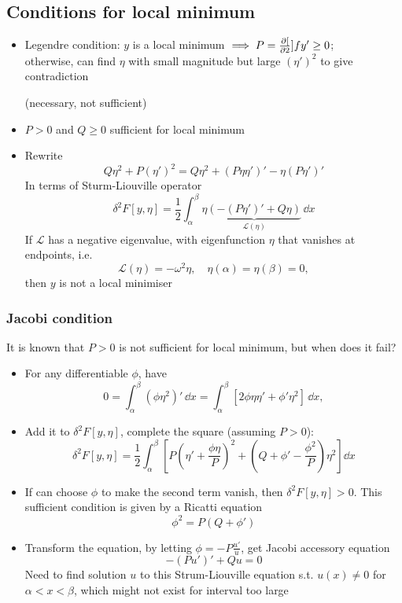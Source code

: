\subsection*{Conditions for local minimum}
\begin{itemize}
    \item Legendre condition: $y$ is a local minimum $\implies P = \frac{\partial{[}}{\partial{2}}]{f}{y'} \geq 0$; \\
          otherwise, can find $\eta$ with small magnitude but large $(\eta')^2$ to give contradiction

          (necessary, not sufficient)

    \item $P>0$ and $Q\geq 0$ sufficient for local minimum
    \item Rewrite \[Q \eta^2 + P (\eta')^2 = Q \eta^2 + (P\eta \eta')' - \eta (P\eta')' \]
          In terms of  Sturm-Liouville operator \[ \delta^2 F[y , \eta ] = \frac{1}{2} \int_\alpha^\beta \eta \underbrace{(-(P\eta')' + Q \eta)}_{\mathcal{L}(\eta)} \, \dd x\]
          If $\mathcal{L}$ has a negative eigenvalue, with eigenfunction $\eta$ that vanishes at endpoints, i.e. \[\mathcal{L}(\eta) = - \omega^2 \eta, \quad \eta(\alpha) = \eta(\beta) = 0,\] then $y$ is not a local minimiser
\end{itemize}

\subsubsection*{Jacobi condition}
It is known that $P>0$ is not sufficient for local minimum, but when does it fail?
\begin{itemize}
    \item For any differentiable $\phi$, have \[ 0 = \int_\alpha^\beta (\phi \eta^2)' \, \dd x = \int_\alpha^\beta [2 \phi \eta \eta' + \phi' \eta^2] \, \dd x, \]
    \item Add it to $\delta^2 F[y , \eta]$, complete the square (assuming $P>0$):
          \[ \delta^2 F[y , \eta ] = \frac{1}{2} \int_\alpha^\beta \left[ P\left( \eta' + \frac{\phi\eta}{P} \right)^2 + \left(Q+\phi' - \frac{\phi^2}{P} \right) \eta^2 \right] \dd x\]

    \item If can choose $\phi$ to make the second term vanish, then $\delta^2 F[y , \eta] >0 $. This sufficient condition is given by a Ricatti equation
          \[\phi^2 = P(Q+\phi')\]
    \item Transform the equation, by letting $\phi = -P \frac{u'}{u}$, get Jacobi accessory equation \[ -(Pu')' + Qu = 0 \]
          Need to find solution $u$ to this Strum-Liouville equation s.t. $u(x) \neq 0$ for $\alpha < x< \beta$, which might not exist for  interval too large

\end{itemize}


